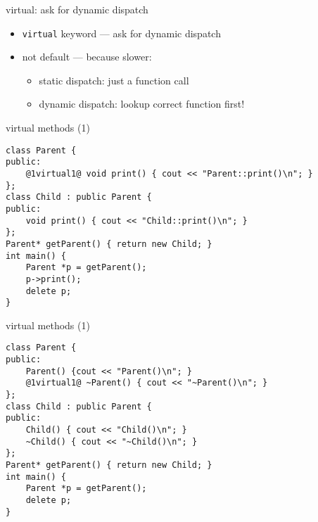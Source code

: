 \begin{frame}{virtual: ask for dynamic dispatch}
    \begin{itemize}
    \item \texttt{virtual} keyword --- ask for dynamic dispatch
    \item not default --- because slower:
        \begin{itemize}
        \item static dispatch: just a function call
        \item dynamic dispatch: lookup correct function first!
        \end{itemize}
    \end{itemize}
\end{frame}

\begin{frame}[fragile,label=staticDispatchPrint]{virtual methods (1)}
\begin{lstlisting}
class Parent {
public:
    @1virtual1@ void print() { cout << "Parent::print()\n"; }
};
class Child : public Parent {
public:
    void print() { cout << "Child::print()\n"; }
};
Parent* getParent() { return new Child; }
int main() {
    Parent *p = getParent();
    p->print();
    delete p;
}
\end{lstlisting}
\end{frame}

\begin{frame}[fragile,label=staticDispatchPrint]{virtual methods (1)}
\begin{lstlisting}
class Parent {
public:
    Parent() {cout << "Parent()\n"; }
    @1virtual1@ ~Parent() { cout << "~Parent()\n"; }
};
class Child : public Parent {
public:
    Child() { cout << "Child()\n"; }
    ~Child() { cout << "~Child()\n"; }
};
Parent* getParent() { return new Child; }
int main() {
    Parent *p = getParent();
    delete p;
}
\end{lstlisting}
\end{frame}


